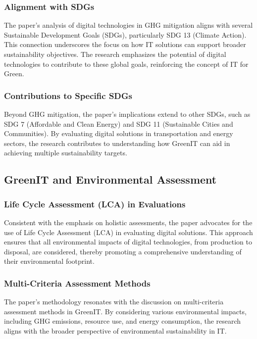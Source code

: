 \documentclass[conference,compsoc]{IEEEtran}
\begin{document}
\subsubsection{Alignment with SDGs}

The paper's analysis of digital technologies in GHG mitigation aligns with several Sustainable Development Goals (SDGs), particularly SDG 13 (Climate Action). This connection underscores the  focus on how IT solutions can support broader sustainability objectives. The research emphasizes the potential of digital technologies to contribute to these global goals, reinforcing the concept of IT for Green.

\subsubsection{Contributions to Specific SDGs}

Beyond GHG mitigation, the paper's implications extend to other SDGs, such as SDG 7 (Affordable and Clean Energy) and SDG 11 (Sustainable Cities and Communities). By evaluating digital solutions in transportation and energy sectors, the research contributes to understanding how GreenIT can aid in achieving multiple sustainability targets.

\subsection{GreenIT and Environmental Assessment}

\subsubsection{Life Cycle Assessment (LCA) in Evaluations}

Consistent with the  emphasis on holistic assessments, the paper advocates for the use of Life Cycle Assessment (LCA) in evaluating digital solutions. This approach ensures that all environmental impacts of digital technologies, from production to disposal, are considered, thereby promoting a comprehensive understanding of their environmental footprint.

\subsubsection{Multi-Criteria Assessment Methods}

The paper's methodology resonates with the  discussion on multi-criteria assessment methods in GreenIT. By considering various environmental impacts, including GHG emissions, resource use, and energy consumption, the research aligns with the broader perspective of environmental sustainability in IT.
\end{document}
